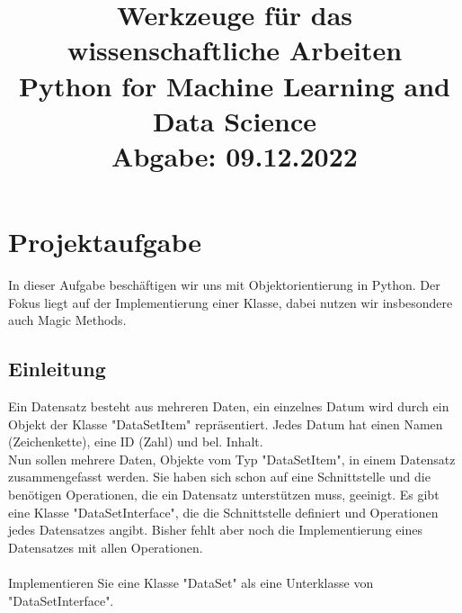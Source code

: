 \documentclass[titlepage]{article}
\begin{document}
\begin{titlepage}
\bf\title{Werkzeuge für das wissenschaftliche Arbeiten\\Python for Machine Learning and Data Science\\ Abgabe: 09.12.2022}
\date{}
\maketitle

\end{titlepage}


\tableofcontents
\section{Projektaufgabe}
In dieser Aufgabe beschäftigen wir uns mit Objektorientierung in Python.
Der Fokus liegt auf der Implementierung einer Klasse, dabei nutzen wir insbesondere auch Magic Methods.\\
\begin{center}
    

\end{center}

\subsection{Einleitung}
Ein Datensatz besteht aus mehreren Daten, ein einzelnes Datum wird durch ein Objekt der Klasse "DataSetItem" repräsentiert.
Jedes Datum hat einen Namen (Zeichenkette), eine ID (Zahl) und bel. Inhalt.\\
Nun sollen mehrere Daten, Objekte vom Typ "DataSetItem", in einem Datensatz zusammengefasst werden.
Sie haben sich schon auf eine Schnittstelle und die benötigen Operationen, die ein Datensatz unterstützen muss, geeinigt.
Es gibt eine Klasse "DataSetInterface", die die Schnittstelle definiert und Operationen jedes Datensatzes angibt.
Bisher fehlt aber noch die Implementierung eines Datensatzes mit allen Operationen.\\
\\
Implementieren Sie eine Klasse "DataSet" als eine Unterklasse von "DataSetInterface".\\
\\
\end{document}
